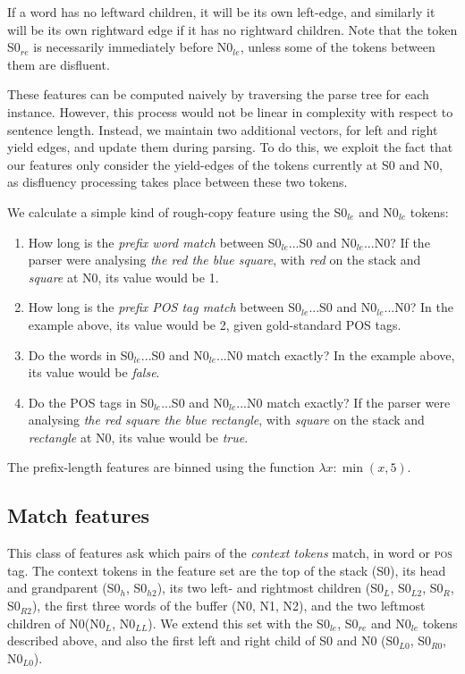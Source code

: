 \documentclass[11pt,letterpaper]{article}
\newcommand{\pos}{\textsc{pos}\xspace}
\newcommand{\szero}{S0\xspace}
\newcommand{\nzero}{N0\xspace}
\newcommand{\szeroH}{S0$_h$\xspace}
\newcommand{\szeroHH}{S0$_{h2}$\xspace}
\newcommand{\szeroL}{S0$_L$\xspace}
\newcommand{\szeroLL}{S0$_{L2}$\xspace}
\newcommand{\szeroR}{S0$_R$\xspace}
\newcommand{\szeroRR}{S0$_{R2}$\xspace}
\newcommand{\szeroLzero}{S0$_{L0}$\xspace}
\newcommand{\szeroRzero}{S0$_{R0}$\xspace}
\newcommand{\nzeroL}{N0$_L$\xspace}
\newcommand{\nzeroLL}{N0$_{LL}$\xspace}
\newcommand{\nzeroLzero}{N0$_{L0}$\xspace}
\newcommand{\szeroRedge}{S0$_{re}$\xspace}
\newcommand{\szeroLedge}{S0$_{le}$\xspace}
\newcommand{\nzeroLedge}{N0$_{le}$\xspace}
\begin{document}
If a word has
no leftward children, it will be its own left-edge, and similarly it will be
its own rightward edge if it has no rightward children. Note that the token
\szeroRedge is necessarily immediately before \nzeroLedge, unless some of the
tokens between them are disfluent.

These features can be computed naively by traversing the parse tree for each
instance. However, this process would not be linear in complexity with respect
to sentence length.  Instead, we maintain two additional vectors, for left
and right yield edges, and update them during parsing.  To do this, we exploit
the fact that our features only consider the yield-edges of the tokens currently
at S0 and N0, as disfluency processing takes place between these two tokens.

We calculate a simple kind of rough-copy feature using the \szeroLedge and
\nzeroLedge tokens:

\begin{enumerate}
    \itemsep0em
    \item How long is the \emph{prefix word match} between \szeroLedge...\szero
        and \nzeroLedge...\nzero? If the parser were analysing \emph{the red the blue square},
        with \emph{red} on the stack and \emph{square} at \nzero, its value would be 1.
    \item How long is the \emph{prefix POS tag match} between \szeroLedge...\szero
          and \nzeroLedge...\nzero? In the example above, its value would be 2,
          given gold-standard POS tags.
    \item Do the words in \szeroLedge...\szero and \nzeroLedge...\nzero match
        exactly?  In the example above, its value would be \emph{false}.
    \item Do the POS tags in \szeroLedge...\szero and \nzeroLedge...\nzero match
        exactly? If the parser were analysing \emph{the red square the blue rectangle},
        with \emph{square} on the stack and \emph{rectangle} at \nzero, its
        value would be \emph{true}.
\end{enumerate}

The prefix-length features are binned using the function $\lambda x: \min(x, 5)$.

\subsection{Match features}

This class of features ask which pairs of the \emph{context tokens} match, in
word or \pos tag.  The context tokens in the \citet{zhang:11} feature set
are the top of the stack (\szero), its head and grandparent (\szeroH, \szeroHH),
its two left- and rightmost children (\szeroL, \szeroLL, \szeroR, \szeroRR), the
first three words of the buffer (\nzero, N1, N2), and the two leftmost children
of \nzero (\nzeroL, \nzeroLL).
We extend this set with the \szeroLedge, \szeroRedge and \nzeroLedge tokens
described above, and also the first left and right child of \szero and \nzero
(\szeroLzero, \szeroRzero, \nzeroLzero).
\end{document}
